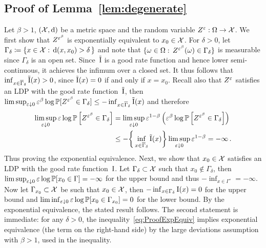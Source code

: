 \subsection{Proof of Lemma~\ref{lem:degenerate}}\label{sec:lem:degenerate_Proof}
Let $\beta > 1$, $(\mathcal{X}, \mathrm{d})$ be a metric space and the random variable ${Z^\varepsilon:\Omega\rightarrow \mathcal{X}}$. We first show that $Z^{\varepsilon^\beta}$ is exponentially equivalent to $x_0\in \mathcal{X}$. For $\delta > 0$, let~${\Gamma_{\delta} \coloneqq \{x \in \mathcal{X} : \, \mathrm{d}(x,x_0)>\delta \, \}}$ and note that $\{\omega \in \Omega : \, Z^{\varepsilon^\beta}(\omega)\in\Gamma_\delta\}$ is measurable since $\Gamma_\delta$ is an open set. 
Since~$\tilde{\mathrm{I}}$ is  a good rate function and hence lower semi-continuous, it achieves the infimum over a closed set. 
It thus follows that $\inf_{x\in\overline{\Gamma}_\delta} \tilde{\mathrm{I}}(x) > 0$, since $\tilde{\mathrm{I}}(x)=0$ if and only if $x=x_0$. Recall also that $Z^\varepsilon$ satisfies an LDP with the good rate function~$\tilde{\mathrm{I}}$, then $\limsup_{\varepsilon\downarrow 0}\varepsilon^\beta\log\mathbb{P}[ Z^{\varepsilon^\beta} \in \Gamma_\delta] \leq - \inf_{x\in\overline{\Gamma}_\delta}\tilde{\mathrm{I}}(x)$ and therefore
\begin{align}\label{eq:ProofExpEquiv}
\limsup_{\varepsilon\downarrow 0} \varepsilon \log \mathbb{P} \left[ Z^{\varepsilon^\beta} \in \Gamma_\delta \right] &= \limsup_{\varepsilon\downarrow 0} \varepsilon^{1-\beta}\left(\varepsilon^\beta \log \mathbb{P} \left[ Z^{\varepsilon^\beta} \in \Gamma_\delta \right]\right) \\
&\leq -\bigg\{ \inf_{x\in\overline{\Gamma}_\delta} \tilde{\mathrm{I}}(x)\bigg\} \limsup_{\varepsilon\downarrow 0}\varepsilon^{1-\beta} = -\infty\,.\nonumber
\end{align}
Thus proving the exponential equivalence. Next, we show that $x_0\in\mathcal{X}$ satisfies an LDP with the good rate function~$\mathrm{I}$. Let $\Gamma_{\delta}\subset\mathcal{X}$ such that $x_0\notin\Gamma_{\delta}$, then $\limsup_{\varepsilon\downarrow 0} \varepsilon \log \mathbb{P}[x_0\in\Gamma]=-\infty$ for the upper bound and thus $-\inf_{x\in\Gamma^\circ}=-\infty$. Now let $\Gamma_{x_0}\subset\mathcal{X}$ be such that $x_0\in\mathcal{X}$, then $-\inf_{x\in\Gamma_{\delta}} \mathrm{I}(x)=0$ for the upper bound and $\liminf_{\varepsilon\downarrow 0}\varepsilon \log \mathbb{P}[x_0\in\Gamma_{x_0}]=0$ for the lower bound. By the exponential equivalence, the stated result follows.
The second statement is immediate:
for any $\delta>0$, 
the inequality~\eqref{eq:ProofExpEquiv}
implies exponential equivalence (the term on the right-hand side)
by the large deviations assumption with $\beta>1$, used in the inequality. 

